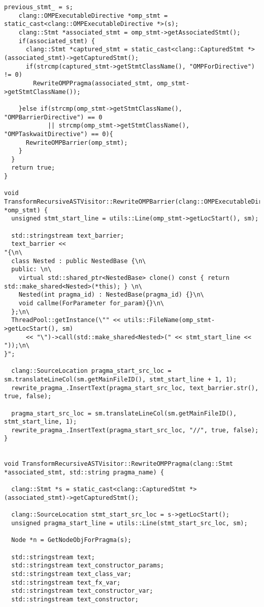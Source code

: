 \documentclass[a4paper,10pt,twoside]{book}
\begin{document}
\begin{lstlisting}[language=CCC, caption=driver/program.cpp]
    previous_stmt_ = s;
    clang::OMPExecutableDirective *omp_stmt = static_cast<clang::OMPExecutableDirective *>(s);
    clang::Stmt *associated_stmt = omp_stmt->getAssociatedStmt();
    if(associated_stmt) {
      clang::Stmt *captured_stmt = static_cast<clang::CapturedStmt *>(associated_stmt)->getCapturedStmt();
      if(strcmp(captured_stmt->getStmtClassName(), "OMPForDirective") != 0)
        RewriteOMPPragma(associated_stmt, omp_stmt->getStmtClassName());

    }else if(strcmp(omp_stmt->getStmtClassName(), "OMPBarrierDirective") == 0
            || strcmp(omp_stmt->getStmtClassName(), "OMPTaskwaitDirective") == 0){
      RewriteOMPBarrier(omp_stmt);
    }
  }
  return true;
}

void TransformRecursiveASTVisitor::RewriteOMPBarrier(clang::OMPExecutableDirective *omp_stmt) {
  unsigned stmt_start_line = utils::Line(omp_stmt->getLocStart(), sm);
  
  std::stringstream text_barrier;
  text_barrier <<
"{\n\
  class Nested : public NestedBase {\n\
  public: \n\
    virtual std::shared_ptr<NestedBase> clone() const { return std::make_shared<Nested>(*this); } \n\
    Nested(int pragma_id) : NestedBase(pragma_id) {}\n\
    void callme(ForParameter for_param){}\n\
  };\n\
  ThreadPool::getInstance(\"" << utils::FileName(omp_stmt->getLocStart(), sm) 
      << "\")->call(std::make_shared<Nested>(" << stmt_start_line << "));\n\
}";

  clang::SourceLocation pragma_start_src_loc = sm.translateLineCol(sm.getMainFileID(), stmt_start_line + 1, 1);
  rewrite_pragma_.InsertText(pragma_start_src_loc, text_barrier.str(), true, false);

  pragma_start_src_loc = sm.translateLineCol(sm.getMainFileID(), stmt_start_line, 1);
  rewrite_pragma_.InsertText(pragma_start_src_loc, "//", true, false);
}


void TransformRecursiveASTVisitor::RewriteOMPPragma(clang::Stmt *associated_stmt, std::string pragma_name) {
  
  clang::Stmt *s = static_cast<clang::CapturedStmt *>(associated_stmt)->getCapturedStmt();

  clang::SourceLocation stmt_start_src_loc = s->getLocStart();
  unsigned pragma_start_line = utils::Line(stmt_start_src_loc, sm);

  Node *n = GetNodeObjForPragma(s);
  
  std::stringstream text;
  std::stringstream text_constructor_params;
  std::stringstream text_class_var;
  std::stringstream text_fx_var;
  std::stringstream text_constructor_var;
  std::stringstream text_constructor;


\end{lstlisting}
\end{document}
